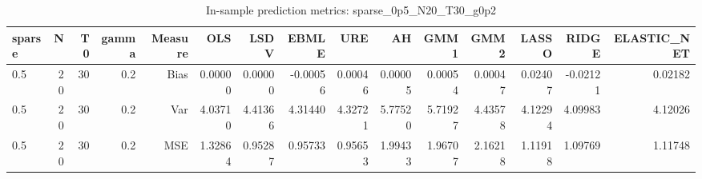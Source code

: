 \begin{table}[!htbp]\centering
\caption{In-sample prediction metrics: sparse_0p5_N20_T30_g0p2}
\label{tab:table2_sparse_0p5_N20_T30_g0p2}
\begin{tabular}{lrrrrrrrrrrrrrr}
\hline
sparse & N & T0 & gamma & Measure & OLS & LSDV & EBMLE & URE & AH & GMM1 & GMM2 & LASSO & RIDGE & ELASTIC_NET \\
\hline
0.5 & 20 & 30 & 0.2 & Bias & 0.00000 & 0.00000 & -0.00056 & 0.00046 & 0.00005 & 0.00054 & 0.00047 & 0.02407 & -0.02121 & 0.02182 \\
0.5 & 20 & 30 & 0.2 & Var & 4.03710 & 4.41366 & 4.31440 & 4.32721 & 5.77520 & 5.71927 & 4.43578 & 4.12294 & 4.09983 & 4.12026 \\
0.5 & 20 & 30 & 0.2 & MSE & 1.32864 & 0.95287 & 0.95733 & 0.95653 & 1.99433 & 1.96707 & 2.16218 & 1.11918 & 1.09769 & 1.11748 \\
\hline
\end{tabular}
\end{table}

